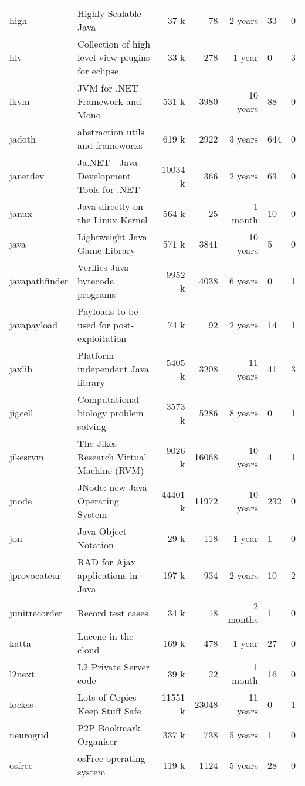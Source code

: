 \begin{table*}[htb]
\begin{tabularx}{\textwidth}{|l|l|r|r|r|Y|Y|}
  high & Highly Scalable Java & 37 k &  78 & 2 years &  33 &   0 \\ 
  hlv & Collection of high level view plugins for eclipse & 33 k & 278 & 1 year &   0 &   3 \\ 
  ikvm & JVM for .NET Framework and Mono & 531 k & 3980 & 10 years &  88 &   0 \\ 
  jadoth & abstraction utils and frameworks & 619 k & 2922 & 3 years & 644 &   0 \\ 
  janetdev & Ja.NET - Java Development Tools for .NET & 10034 k & 366 & 2 years &  63 &   0 \\ 
  janux & Java directly on the Linux Kernel & 564 k &  25 & 1 month &  10 &   0 \\ 
  java & Lightweight Java Game Library & 571 k & 3841 & 10 years &   5 &   0 \\ 
  javapathfinder & Verifies Java bytecode programs & 9952 k & 4038 & 6 years &   0 &   1 \\ 
  javapayload & Payloads to be used for post-exploitation & 74 k &  92 & 2 years &  14 &   1 \\ 
  jaxlib & Platform independent Java library & 5405 k & 3208 & 11 years &  41 &   3 \\ 
  jigcell & Computational biology problem solving & 3573 k & 5286 & 8 years &   0 &   1 \\ 
  jikesrvm & The Jikes Research Virtual Machine (RVM) & 9026 k & 16068 & 10 years &   4 &   1 \\ 
  jnode & JNode: new Java Operating System & 44401 k & 11972 & 10 years & 232 &   0 \\ 
  jon & Java Object Notation & 29 k & 118 & 1 year &   1 &   0 \\ 
  jprovocateur & RAD for Ajax applications in Java & 197 k & 934 & 2 years &  10 &   2 \\ 
  junitrecorder & Record test cases & 34 k &  18 & 2 months &   1 &   0 \\ 
  katta & Lucene in the cloud & 169 k & 478 & 1 year &  27 &   0 \\ 
  l2next & L2 Private Server code & 39 k &  22 & 1 month &  16 &   0 \\ 
  lockss & Lots of Copies Keep Stuff Safe & 11551 k & 23048 & 11 years &   0 &   1 \\ 
  neurogrid & P2P Bookmark Organiser & 337 k & 738 & 5 years &   1 &   0 \\ 
  osfree & osFree operating system & 119 k & 1124 & 5 years &  28 &   0 \\ 

\end{tabularx}
\end{table*}
